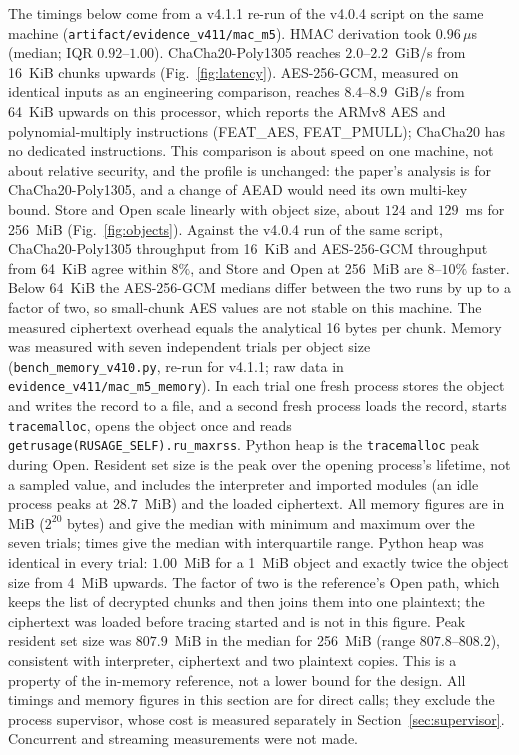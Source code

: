 \documentclass[pdflatex,sn-mathphys-num,twocolumn]{sn-jnl}
\theoremstyle{plain}
\theoremstyle{definition}
\newcommand{\code}[1]{\texttt{#1}}
\begin{document}
The timings below come from a v4.1.1 re-run of the v4.0.4 script on the same machine (\code{artifact/evidence\_v411/mac\_m5}). HMAC derivation took $0.96\,\mu$s (median; IQR $0.92$--$1.00$). ChaCha20-Poly1305 reaches $2.0$--$2.2$~GiB/s from 16~KiB chunks upwards (Fig.~\ref{fig:latency}). AES-256-GCM, measured on identical inputs as an engineering comparison, reaches $8.4$--$8.9$~GiB/s from 64~KiB upwards on this processor, which reports the ARMv8 AES and polynomial-multiply instructions (FEAT\_AES, FEAT\_PMULL); ChaCha20 has no dedicated instructions. This comparison is about speed on one machine, not about relative security, and the profile is unchanged: the paper's analysis is for ChaCha20-Poly1305, and a change of AEAD would need its own multi-key bound. Store and Open scale linearly with object size, about $124$ and $129$~ms for 256~MiB (Fig.~\ref{fig:objects}). Against the v4.0.4 run of the same script, ChaCha20-Poly1305 throughput from 16~KiB and AES-256-GCM throughput from 64~KiB agree within $8\%$, and Store and Open at 256~MiB are $8$--$10\%$ faster. Below 64~KiB the AES-256-GCM medians differ between the two runs by up to a factor of two, so small-chunk AES values are not stable on this machine. The measured ciphertext overhead equals the analytical 16 bytes per chunk. Memory was measured with seven independent trials per object size (\code{bench\_memory\_v410.py}, re-run for v4.1.1; raw data in \code{evidence\_v411/}\allowbreak\code{mac\_m5\_memory}). In each trial one fresh process stores the object and writes the record to a file, and a second fresh process loads the record, starts \code{tracemalloc}, opens the object once and reads \code{getrusage(RUSAGE\_SELF).ru\_maxrss}. Python heap is the \code{tracemalloc} peak during Open. Resident set size is the peak over the opening process's lifetime, not a sampled value, and includes the interpreter and imported modules (an idle process peaks at $28.7$~MiB) and the loaded ciphertext. All memory figures are in MiB ($2^{20}$ bytes) and give the median with minimum and maximum over the seven trials; times give the median with interquartile range. Python heap was identical in every trial: $1.00$~MiB for a 1~MiB object and exactly twice the object size from 4~MiB upwards. The factor of two is the reference's Open path, which keeps the list of decrypted chunks and then joins them into one plaintext; the ciphertext was loaded before tracing started and is not in this figure. Peak resident set size was $807.9$~MiB in the median for 256~MiB (range $807.8$--$808.2$), consistent with interpreter, ciphertext and two plaintext copies. This is a property of the in-memory reference, not a lower bound for the design. All timings and memory figures in this section are for direct calls; they exclude the process supervisor, whose cost is measured separately in Section~\ref{sec:supervisor}. Concurrent and streaming measurements were not made.
\end{document}
